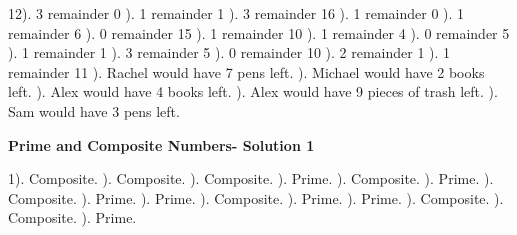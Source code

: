 \documentclass{article}%
\begin{document}
12). 3 remainder 0%
). 1 remainder 1%
). 3 remainder 16%
). 1 remainder 0%
). 1 remainder 6%
). 0 remainder 15%
). 1 remainder 10%
). 1 remainder 4%
). 0 remainder 5%
). 1 remainder 1%
). 3 remainder 5%
). 0 remainder 10%
). 2 remainder 1%
). 1 remainder 11%
). Rachel would have 7 pens left.%
). Michael would have 2 books left.%
). Alex would have 4 books left.%
). Alex would have 9 pieces of trash left.%
). Sam would have 3 pens left.%
\newline%
\newpage%
\large%
\begin{center}%
\textbf{Prime and Composite Numbers- Solution 1}%
\newline%
\end{center} \normalsize%
1). Composite.%
). Composite.%
). Composite.%
). Prime.%
). Composite.%
). Prime.%
). Composite.%
). Prime.%
). Prime.%
). Composite.%
). Prime.%
). Prime.%
). Composite.%
). Composite.%
). Prime.%
\newline%
\end{document}
